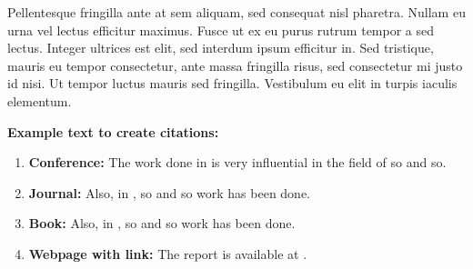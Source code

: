 Pellentesque fringilla ante at sem aliquam, sed consequat nisl pharetra. Nullam eu urna vel lectus efficitur maximus. Fusce ut ex eu purus rutrum tempor a sed lectus. Integer ultrices est elit, sed interdum ipsum efficitur in. Sed tristique, mauris eu tempor consectetur, ante massa fringilla risus, sed consectetur mi justo id nisi. Ut tempor luctus mauris sed fringilla. Vestibulum eu elit in turpis iaculis elementum.

\textbf{Example text to create citations:}
\begin{enumerate}
    \item \textbf{Conference:} The work done in \cite{conference1} is very influential in the field of so and so.
    \item \textbf{Journal:} Also, in \cite{journal1}, so and so work has been done.
    \item \textbf{Book:} Also, in \cite{book1}, so and so work has been done.
    \item \textbf{Webpage with link:} The report is available at \cite{link1}.
\end{enumerate} 